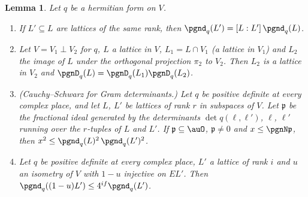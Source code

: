 \documentclass[10pt]{amsart}
\newtheorem{lemma}[theorem]{Lemma}
\theoremstyle{definition}
\theoremstyle{remark}
\begin{document}
\begin{lemma}\label{pbg:basic}
Let $q$ be a hermitian form on $V$.
\begin{enumerate}
\item[(a)] If $L'\subseteq L$ are lattices of the same rank, then $\pgnd_q(L')=[L:L']\,\pgnd_q(L)$.
\item[(b)] Let $V=V_1\perp V_2$ for $q$, $L$ a lattice in $V$, $L_1=L\cap V_1$ (a lattice in $V_1$) and
$L_2$ the image of $L$ under the orthogonal projection $\pi_2$ to $V_2$. Then $L_2$ is a lattice in
$V_2$ and $\pgnD_q(L)=\pgnD_q(L_1)\pgnD_q(L_2)$.
\item[(c)] \textup{(Cauchy--Schwarz for Gram determinants.)} Let $q$ be positive definite at every complex place, and let $L$,
$L'$ be lattices of rank $r$ in subspaces of $V$. Let $\mathfrak p$ be the fractional ideal generated
by the determinants $\det q(\ell,\ell')$, $\ell$, $\ell'$ running over the $r$-tuples of $L$ and $L'$.
If $\mathfrak p\subseteq\auO$, $\mathfrak p\ne0$ and $x\le\pgnN\mathfrak p$, then $x^2\le\pgnd_q(L)^2\,
\pgnd_q(L')^2$.
\item[(d)] Let $q$ be positive definite at every complex place, $L'$ a lattice of rank $i$ and $u$ an
isometry of $V$ with $1-u$ injective on $EL'$. Then $\pgnd_q((1-u)L')\le4^{if}\pgnd_q(L')$.
\end{enumerate}
\end{lemma}
\end{document}
